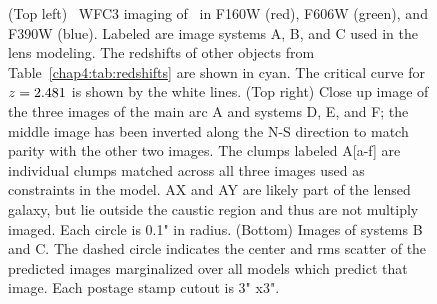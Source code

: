 \begin{figure}
\caption[\hst\ image and lens model of \cluster]{(Top left) \hst\ WFC3 imaging of \cluster\ in F160W (red), F606W (green), and F390W (blue). Labeled are image systems A, B, and C used in the lens modeling. The redshifts of other objects from Table~\ref{chap4:tab:redshifts} are shown in cyan. The critical curve for $z=2.481$ is shown by the white lines. (Top right) Close up image of the three images of the main arc A and systems D, E, and F; the middle image has been inverted along the N-S direction to match parity with the other two images. The clumps labeled A[a-f] are individual clumps matched across all three images used as constraints in the model. AX and AY are likely part of the lensed galaxy, but lie outside the caustic region and thus are not multiply imaged. Each circle is 0.1" in radius. (Bottom) Images of systems B and C. The dashed circle indicates the center and rms scatter of the predicted images marginalized over all models which predict that image. Each postage stamp cutout is 3" x3".}
\label{chap4:fig:arclabels}
\end{figure}

